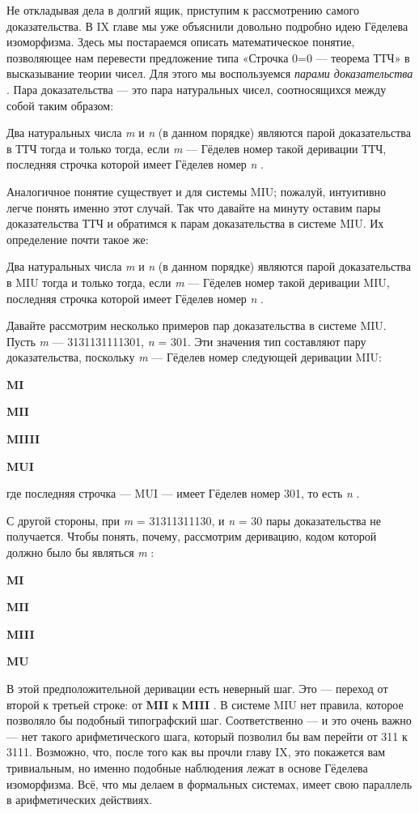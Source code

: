 \documentclass[../main.tex]{subfiles}
\begin{document}
Не откладывая дела в долгий ящик, приступим к рассмотрению самого доказательства. В IX главе мы уже объяснили довольно подробно идею Гёделева изоморфизма. Здесь мы постараемся описать математическое понятие, позволяющее нам перевести предложение типа «Строчка 0=0 --- теорема ТТЧ» в высказывание теории чисел. Для этого мы воспользуемся \emph{парами доказательства} . Пара доказательства --- это пара натуральных чисел, соотносящихся между собой таким образом:

Два натуральных числа \emph{m} и \emph{n} (в данном порядке) являются парой доказательства в ТТЧ тогда и только тогда, если \emph{m} --- Гёделев номер такой деривации ТТЧ, последняя строчка которой имеет Гёделев номер \emph{n} .

Аналогичное понятие существует и для системы MIU; пожалуй, интуитивно легче понять именно этот случай. Так что давайте на минуту оставим пары доказательства ТТЧ и обратимся к парам доказательства в системе MIU\@. Их определение почти такое же:

Два натуральных числа \emph{m} и \emph{n} (в данном порядке) являются парой доказательства в MIU тогда и только тогда, если \emph{m} --- Гёделев номер такой деривации MIU, последняя строчка которой имеет Гёделев номер \emph{n} .

Давайте рассмотрим несколько примеров пар доказательства в системе MIU\@. Пусть \emph{m} --- 3131131111301, \emph{n} = 301. Эти значения тип составляют пару доказательства, поскольку \emph{m} --- Гёделев номер следующей деривации MIU:

\textbf{MI}

\textbf{MII}

\textbf{MIIII}

\textbf{MUI}

где последняя строчка --- MUI --- имеет Гёделев номер 301, то есть \emph{n} .

С другой стороны, при \emph{m} = 31311311130, и \emph{n} = 30 пары доказательства не получается. Чтобы понять, почему, рассмотрим деривацию, кодом которой должно было бы являться \emph{m} :

\textbf{MI}

\textbf{MII}

\textbf{MIII}

\textbf{MU}

В этой предположительной деривации есть неверный шаг. Это --- переход от второй к третьей строке: от \textbf{MII} к \textbf{MIII} . В системе MIU нет правила, которое позволяло бы подобный типографский шаг. Соответственно --- и это очень важно --- нет такого арифметического шага, который позволил бы вам перейти от 311 к 3111. Возможно, что, после того как вы прочли главу IX, это покажется вам тривиальным, но именно подобные наблюдения лежат в основе Гёделева изоморфизма. Всё, что мы делаем в формальных системах, имеет свою параллель в арифметических действиях.
\end{document}
